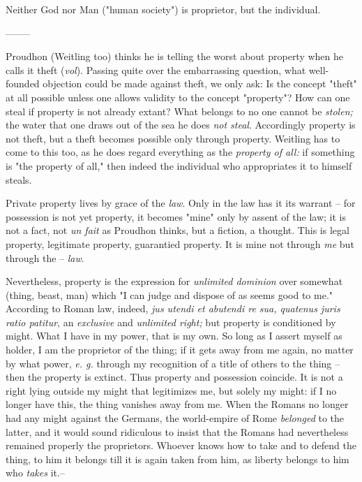Neither God nor Man ("{}human society"{}) is proprietor, but the individual.

\begin{center}
--------\end{center}


Proudhon (Weitling too) thinks he is telling the worst about property when he 
calls it theft (\textit{vol}). Passing quite over the embarrassing question, 
what well-founded objection could be made against theft, we only ask: Is the 
concept "{}theft"{} at all possible unless one allows validity to the concept 
"{}property"{}? How can one steal if property is not already extant? What 
belongs to no one cannot be \textit{stolen;} the water that one draws out of 
the sea he does \textit{not steal}. Accordingly property is not theft, but a 
theft becomes possible only through property. Weitling has to come to this 
too, as he does regard everything as the \textit{property of all:} if 
something is "{}the property of all,"{} then indeed the individual who 
appropriates it to himself steals.

Private property lives by grace of the \textit{law}. Only in the law has it 
its warrant -- for possession is not yet property, it becomes "{}mine"{} only 
by assent of the law; it is not a fact, not \textit{un fait} as Proudhon 
thinks, but a fiction, a thought. This is legal property, legitimate property, 
guarantied property. It is mine not through \textit{me} but through the -- 
\textit{law}.

Nevertheless, property is the expression for \textit{unlimited dominion} over 
somewhat (thing, beast, man) which "{}I can judge and dispose of as seems good 
to me."{} According to Roman law, indeed, \textit{jus utendi et abutendi re 
sua, quatenus juris ratio patitur}, an \textit{exclusive} and 
\textit{unlimited right;} but property is conditioned by might. What I have in 
my power, that is my own. So long as I assert myself as holder, I am the 
proprietor of the thing; if it gets away from me again, no matter by what 
power, \textit{e. g.} through my recognition of a title of others to the thing 
-- then the property is extinct. Thus property and possession coincide. It is 
not a right lying outside my might that legitimizes me, but solely my might: 
if I no longer have this, the thing vanishes away from me. When the Romans no 
longer had any might against the Germans, the world-empire of Rome 
\textit{belonged} to the latter, and it would sound ridiculous to insist that 
the Romans had nevertheless remained properly the proprietors. Whoever knows 
how to take and to defend the thing, to him it belongs till it is again taken 
from him, as liberty belongs to him who \textit{takes} it.--

